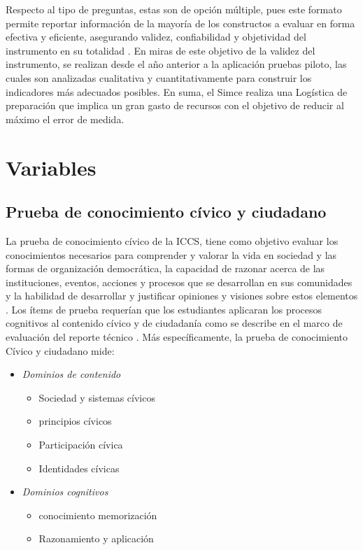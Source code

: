 \documentclass[12pt,twoside]{templates/facsothesis}
\providecommand{\tightlist}{%
  \setlength{\itemsep}{0pt}\setlength{\parskip}{0pt}}
\begin{document}
Respecto al tipo de preguntas, estas son de opción múltiple, pues este formato permite reportar información de la mayoría de los constructos a evaluar en forma efectiva y eficiente, asegurando validez, confiabilidad y objetividad del instrumento en su totalidad \citep{rupp_Handbook_2008}. En miras de este objetivo de la validez del instrumento, se realizan desde el año anterior a la aplicación pruebas piloto, las cuales son analizadas cualitativa y cuantitativamente para construir los indicadores más adecuados posibles. En suma, el Simce realiza una Logística de preparación que implica un gran gasto de recursos con el objetivo de reducir al máximo el error de medida.

\hypertarget{variables}{%
\section{Variables}\label{variables}}

\hypertarget{prueba-de-conocimiento-cuxedvico-y-ciudadano}{%
\subsection{Prueba de conocimiento cívico y ciudadano}\label{prueba-de-conocimiento-cuxedvico-y-ciudadano}}

La prueba de conocimiento cívico de la ICCS, tiene como objetivo evaluar los conocimientos necesarios para comprender y valorar la vida en sociedad y las formas de organización democrática, la capacidad de razonar acerca de las instituciones, eventos, acciones y procesos que se desarrollan en sus comunidades y la habilidad de desarrollar y justificar opiniones y visiones sobre estos elementos \citep{schulz_Initial_2010}. Los ítems de prueba requerían que los estudiantes aplicaran los procesos cognitivos al contenido cívico y de ciudadanía como se describe en el marco de evaluación del reporte técnico \citep{schulz_ICCS_2016}. Más específicamente, la prueba de conocimiento Cívico y ciudadano mide:

\begin{itemize}
\tightlist
\item
  \emph{Dominios de contenido}

  \begin{itemize}
  \tightlist
  \item
    Sociedad y sistemas cívicos
  \item
    principios cívicos
  \item
    Participación cívica
  \item
    Identidades cívicas
  \end{itemize}
\item
  \emph{Dominios cognitivos}

  \begin{itemize}
  \tightlist
  \item
    conocimiento memorización
  \item
    Razonamiento y aplicación
  \end{itemize}
\end{itemize}
\end{document}
